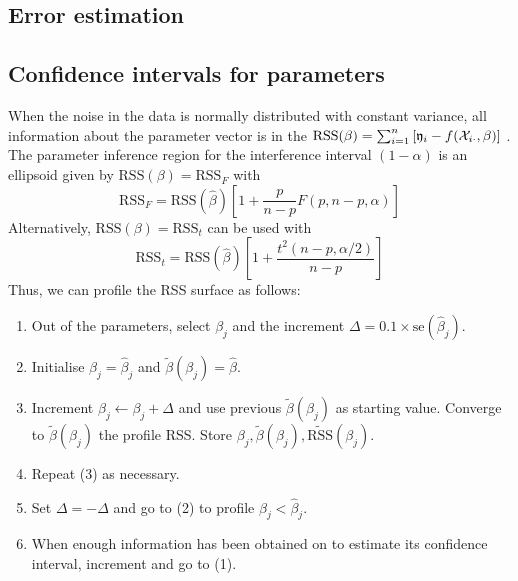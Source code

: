 \begin{refsection}
\section{Error estimation}

\subsection{Confidence intervals for parameters}

When the noise in the data is normally distributed with constant variance, all information about the parameter vector \skalar{\beta} is in the \(\mathrm{RSS}(\beta) = \sum_{i=1}^n{[\mathfrak{y}_i - f(\mathcal{X}_{i\cdot},\beta)]}\) \parencite{Wat-94}. The parameter inference region for the interference interval \((1-\alpha)\) is an ellipsoid given by \(\mathrm{RSS}(\beta) = \mathrm{RSS}_F\) with
\begin{equation}
  \mathrm{RSS}_F = \mathrm{RSS}(\hat{\beta})\left[1 + \frac{p}{n-p} F(p, n-p, \alpha)\right]
\end{equation}
Alternatively, \(\mathrm{RSS}(\beta) = \mathrm{RSS}_t\) can be used with
\begin{equation}
  \mathrm{RSS}_t = \mathrm{RSS}(\hat{\beta})\left[1 + \frac{t^2(n-p, \alpha/2)}{n-p}\right]
\end{equation}
Thus, we can profile the \acs{RSS} surface as follows:
\begin{enumerate}
  \item{Out of the  parameters, select \(\beta_j\) and the increment \( \Delta = 0.1 \times \mathrm{se}(\hat{\beta}_j) \).}
  \item{Initialise \( \beta_j = \hat{\beta}_j \) and \( \tilde{\beta}(\beta_j) = \hat{\beta} \).}
  \item{Increment \( \beta_j \leftarrow \beta_j + \Delta \) and use previous \( \tilde{\beta}(\beta_j) \) as starting value. Converge to \( \tilde{\beta}(\beta_j) \) the profile \acs{RSS}. Store \( \beta_j, \tilde{\beta}(\beta_j), \widetilde{\mathrm{RSS}}(\beta_j) \). }
  \item{Repeat (3) as necessary.}
  \item{Set \( \Delta = -\Delta \) and go to (2) to profile \( \beta_j < \hat{\beta}_j \). }
  \item{When enough information has been obtained on  to estimate its confidence interval, increment  and go to (1).}
\end{enumerate}


\end{refsection}
